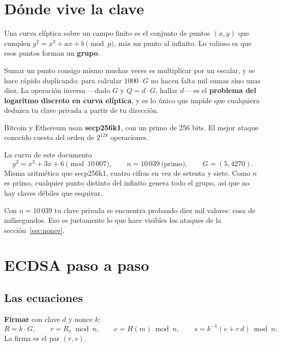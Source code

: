 \documentclass[11pt,a4paper]{article}
\theoremstyle{definition}
\theoremstyle{plain}
\theoremstyle{remark}
\begin{document}
\section{Dónde vive la clave}\label{sec:curva}

Una curva elíptica sobre un campo finito es el conjunto de puntos $(x,y)$ que
cumplen $y^2 = x^3 + ax + b \pmod p$, más un punto al infinito. Lo valioso es que
esos puntos forman un \textbf{grupo}.

Sumar un punto consigo mismo muchas veces es multiplicar por un escalar, y se
hace rápido duplicando: para calcular $1000\cdot G$ no hacen falta mil sumas sino
unas diez. La operación inversa —dado $G$ y $Q = d\cdot G$, hallar $d$— es el
\textbf{problema del logaritmo discreto en curva elíptica}, y es lo único que
impide que cualquiera deduzca tu clave privada a partir de tu dirección.

Bitcoin y Ethereum usan \textbf{secp256k1}, con un primo de 256 bits. El mejor
ataque conocido cuesta del orden de $2^{128}$ operaciones.

\begin{nota}{La curva de este documento}
\[
  y^2 = x^3 + 3x + 6 \pmod{10\,007}, \qquad n = 10\,039 \ \text{(primo)}, \qquad G = (5, 4270).
\]
Misma aritmética que secp256k1, cuatro cifras en vez de setenta y siete. Como $n$
es primo, cualquier punto distinto del infinito genera todo el grupo, así que no
hay claves débiles que esquivar.

Con $n = 10\,039$ tu clave privada se encuentra probando diez mil valores: cosa
de milisegundos. Eso es justamente lo que hace visibles los ataques de la
sección~\ref{sec:nonce}.
\end{nota}

\section{ECDSA paso a paso}\label{sec:ecdsa}

\subsection{Las ecuaciones}

\textbf{Firmar} con clave $d$ y nonce $k$:
\[
  R = k\cdot G, \qquad r = R_x \bmod n, \qquad
  e = H(m) \bmod n, \qquad
  s = k^{-1}(e + r\,d) \bmod n.
\]
La firma es el par $(r,s)$.
\end{document}
